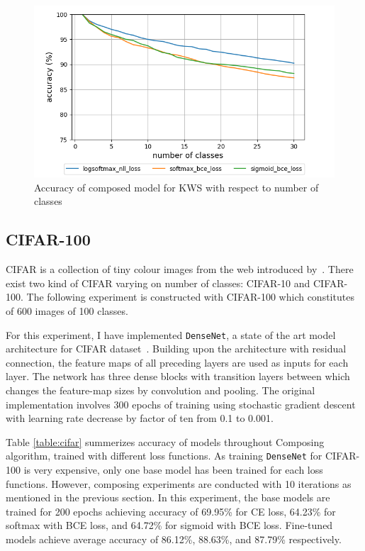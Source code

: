 \documentclass{article}
\begin{document}
\begin{figure}[t]
    \centering
    \includegraphics[scale=0.5,trim={0mm 0mm 0mm 0mm},clip]{kws.png}
    \caption{Accuracy of composed model for KWS with respect to number of classes}
    \label{figure:composed_kws}
\end{figure}

\subsection{CIFAR-100}

CIFAR is a collection of tiny colour images from the web introduced by~\cite{krizhevsky2009learning}. There exist two kind of CIFAR varying on number of classes: CIFAR-10 and CIFAR-100. The following experiment is constructed with CIFAR-100 which constitutes of 600 images of 100 classes.

For this experiment, I have implemented \texttt{DenseNet}, a state of the art model architecture for CIFAR dataset~\cite{huang2017densely}. Building upon the architecture with residual connection, the feature maps of all preceding layers are used as inputs for each layer. The network has three dense blocks with transition layers between which changes the feature-map sizes by convolution and pooling. The original implementation involves 300 epochs of training using stochastic gradient descent with learning rate decrease by factor of ten from 0.1 to 0.001.

Table \ref{table:cifar} summerizes accuracy of models throughout Composing algorithm, trained with different loss functions. As training \texttt{DenseNet} for CIFAR-100 is very expensive, only one base model has been trained for each loss functions. However, composing experiments are conducted with 10 iterations as mentioned in the previous section. In this experiment, the base models are trained for 200 epochs achieving accuracy of 69.95\% for CE loss, 64.23\% for softmax with BCE loss, and 64.72\% for sigmoid with BCE loss. Fine-tuned models achieve average accuracy of 86.12\%, 88.63\%, and 87.79\% respectively.
\end{document}
